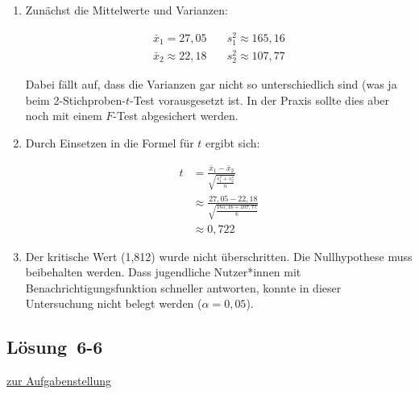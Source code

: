 \documentclass[
  11pt,
  ngerman,
  a4paper,
]{report}
\begin{document}
\begin{enumerate}
\def\labelenumi{\alph{enumi})}
\item
  Zunächst die Mittelwerte und Varianzen:

  \[\begin{aligned}
   \bar{x}_1 =27{,}05 \quad &s^2_1\approx165{,}16\\
   \bar{x}_2 \approx22{,}18 \quad &s^2_2\approx107{,}77
   \end{aligned}\]

  Dabei fällt auf, dass die Varianzen gar nicht so unterschiedlich sind (was ja beim 2-Stichproben-\(t\)-Test vorausgesetzt ist. In der Praxis sollte dies aber noch mit einem \(F\)-Test abgesichert werden.
\item
  Durch Einsetzen in die Formel für \(t\) ergibt sich:

  \[\begin{aligned}
   t&=\frac{\bar{x}_1-\bar{x}_2}{\sqrt{\frac{s^2_1+s^2_2}{n}}}\\[8pt]
   &\approx\frac{27{,}05-22{,}18}{\sqrt{\frac{165{,}16+107{,}77}{6}}}\\[5pt]
   &\approx0{,}722
   \end{aligned}\]
\item
  Der kritische Wert (1,812) wurde nicht überschritten. Die Nullhypothese muss beibehalten werden. Dass jugendliche Nutzer*innen mit Benachrichtigungsfunktion schneller antworten, konnte in dieser Untersuchung nicht belegt werden (\(\alpha=0{,}05\)).
\end{enumerate}

\hypertarget{loesung-6-6}{%
\subsection{Lösung~6-6}\label{loesung-6-6}}

\protect\hyperlink{aufgabe-6-6}{zur Aufgabenstellung}
\end{document}
